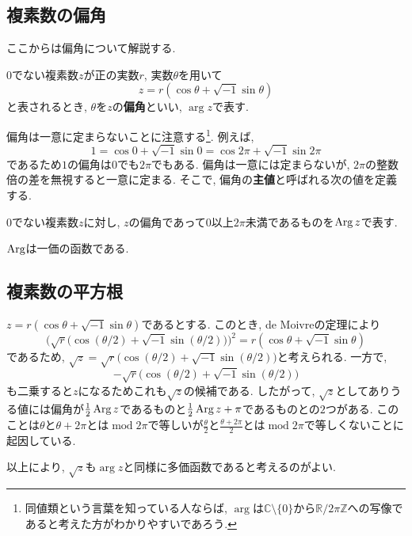 \subsection{複素数の偏角}
ここからは偏角について解説する.
\begin{bdef}
$0$でない複素数$z$が正の実数$r$, 実数$\theta$を用いて
\[z=r(\cos\theta+\sqrt{-1}\sin\theta)\]
と表されるとき, $\theta$を$z$の\textbf{偏角}といい, $\arg z$で表す.
\end{bdef}
偏角は一意に定まらないことに注意する\footnote{同値類という言葉を知っている人ならば, $\arg$は$\mathbb{C}\setminus\{0\}$から$\mathbb{R}/2\pi\mathbb{Z}$への写像であると考えた方がわかりやすいであろう.}.
例えば,
\[1=\cos 0+\sqrt{-1}\sin 0=\cos 2\pi+\sqrt{-1}\sin 2\pi\]
であるため$1$の偏角は$0$でも$2\pi$でもある.
偏角は一意には定まらないが, $2\pi$の整数倍の差を無視すると一意に定まる.
そこで, 偏角の\textbf{主値}と呼ばれる次の値を定義する.
\begin{bdef}
$0$でない複素数$z$に対し, $z$の偏角であって$0$以上$2\pi$未満であるものを$\operatorname{Arg} z$で表す.
\end{bdef}
$\operatorname{Arg}$は一価の函数である.
\subsection{複素数の平方根}
$z=r(\cos\theta+\sqrt{-1}\sin\theta)$であるとする.
このとき, de Moivreの定理により
\[\bigl(\sqrt r\bigl(\cos(\theta/2)+\sqrt{-1}\sin(\theta/2)\bigr)\bigr)^2=r(\cos\theta+\sqrt{-1}\sin\theta)\]
であるため, $\sqrt z=\sqrt r\bigl(\cos(\theta/2)+\sqrt{-1}\sin(\theta/2)\bigr)$と考えられる.
一方で,
\[-\sqrt r\bigl(\cos(\theta/2)+\sqrt{-1}\sin(\theta/2)\bigr)\]
も二乗すると$z$になるためこれも$\sqrt z$の候補である.
したがって, $\sqrt z$としてありうる値には偏角が$\frac 12\operatorname{Arg} z$であるものと$\frac 12\operatorname{Arg} z+\pi$であるものとの$2$つがある.
このことは$\theta$と$\theta+2\pi$とは$\operatorname{mod}2\pi$で等しいが$\frac\theta 2$と$\frac{\theta+2\pi}2$とは$\operatorname{mod}2\pi$で等しくないことに起因している.

以上により, $\sqrt z$も$\arg z$と同様に多価函数であると考えるのがよい.
